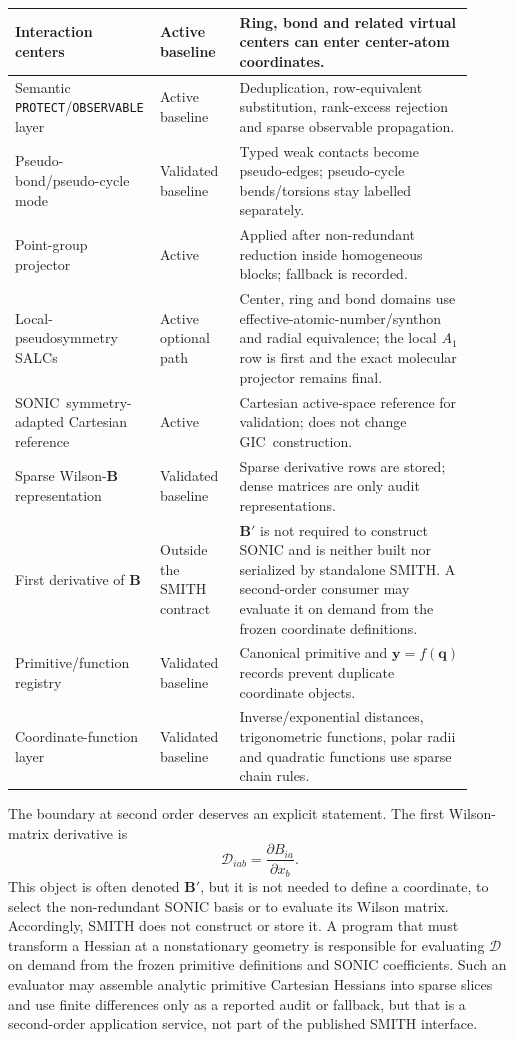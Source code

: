 \documentclass[journal=jctcce,manuscript=article,layout=traditional]{achemso}
\newcommand{\SONIC}{SONIC}
\newcommand{\GIC}{GIC}
\newcommand{\Bmat}{\mathbf{B}}
\newcommand{\q}{\mathbf{q}}
\newcommand{\y}{\mathbf{y}}
\theoremstyle{definition}
\begin{document}
\begin{table}[p]
\begin{tabular}{@{}p{0.24\linewidth}p{0.17\linewidth}p{0.50\linewidth}@{}}
\midrule
Interaction centers & Active baseline & Ring, bond and related virtual centers can enter center-atom coordinates. \\
\midrule
Semantic \texttt{PROTECT}/\texttt{OBSERVABLE} layer & Active baseline & Deduplication, row-equivalent substitution, rank-excess rejection and sparse observable propagation. \\
\midrule
Pseudo-bond/pseudo-cycle mode & Validated baseline & Typed weak contacts become pseudo-edges; pseudo-cycle bends/torsions stay labelled separately. \\
\midrule
Point-group projector & Active & Applied after non-redundant reduction inside homogeneous blocks; fallback is recorded. \\
\midrule
Local-pseudosymmetry SALCs & Active optional path & Center, ring and bond domains use effective-atomic-number/synthon and radial equivalence; the local \(A_1\) row is first and the exact molecular projector remains final. \\
\midrule
\SONIC\ symmetry-adapted Cartesian reference & Active & Cartesian active-space reference for validation; does not change \GIC\ construction. \\
\midrule
Sparse Wilson-\(\Bmat\) representation & Validated baseline & Sparse derivative rows are stored; dense matrices are only audit representations. \\
\midrule
First derivative of \(\Bmat\) & Outside the SMITH contract & \(\Bmat'\) is not required to construct SONIC and is neither built nor serialized by standalone SMITH.  A second-order consumer may evaluate it on demand from the frozen coordinate definitions. \\
\midrule
Primitive/function registry & Validated baseline & Canonical primitive and \(\y=f(\q)\) records prevent duplicate coordinate objects. \\
\midrule
Coordinate-function layer & Validated baseline & Inverse/exponential distances, trigonometric functions, polar radii and quadratic functions use sparse chain rules. \\
\bottomrule
\end{tabular}
\end{table}

The boundary at second order deserves an explicit statement.  The first
Wilson-matrix derivative is
\begin{equation}
 \mathcal D_{iab}=\frac{\partial B_{ia}}{\partial x_b}.
 \label{eq:sparse-b-first-derivative}
\end{equation}
This object is often denoted \(\Bmat'\), but it is not needed to define a
coordinate, to select the non-redundant SONIC basis or to evaluate its Wilson
matrix.  Accordingly, SMITH does not construct or store it.  A program that
must transform a Hessian at a nonstationary geometry is responsible for
evaluating \(\mathcal D\) on demand from the frozen primitive definitions and
SONIC coefficients.  Such an evaluator may assemble analytic primitive
Cartesian Hessians into sparse slices and use finite differences only as a
reported audit or fallback, but that is a second-order application service,
not part of the published SMITH interface.
\end{document}

